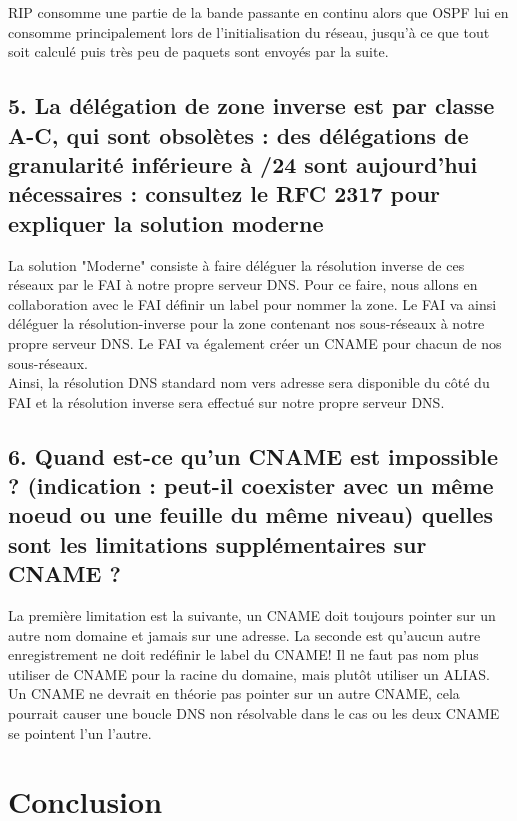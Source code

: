\documentclass{article}
\begin{document}
RIP consomme une partie de la bande passante en continu alors que OSPF lui en consomme principalement lors de l'initialisation du réseau, jusqu'à ce que tout soit calculé puis très peu de paquets sont envoyés par la suite.\\

\subsection*{5. La délégation de zone inverse est par classe A-C, qui sont obsolètes : des délégations de granularité inférieure à /24 sont aujourd’hui nécessaires : consultez le RFC 2317 pour expliquer la solution moderne}
La solution "Moderne" consiste à faire déléguer la résolution inverse de ces réseaux par le FAI à notre propre serveur DNS. Pour ce faire, nous allons en collaboration avec le FAI définir un label pour nommer la zone. Le FAI va ainsi déléguer la résolution-inverse pour la zone contenant nos sous-réseaux à notre propre serveur DNS. Le FAI va également créer un CNAME pour chacun de nos sous-réseaux.\\

Ainsi, la résolution DNS standard nom vers adresse sera disponible du côté du FAI et la résolution inverse sera effectué sur notre propre serveur DNS\cite{RFC-2317-ietf}\cite{RFC-2317-divers}.

\subsection*{6. Quand est-ce qu’un CNAME est impossible ? (indication : peut-il coexister avec un même noeud ou une feuille du même niveau) quelles sont les limitations supplémentaires sur CNAME ?}
La première limitation est la suivante, un CNAME\cite{CNAME} doit toujours pointer sur un autre nom domaine et jamais sur une adresse. La seconde est qu'aucun autre enregistrement ne doit redéfinir le label du CNAME! Il ne faut pas nom plus utiliser de CNAME pour la racine du domaine, mais plutôt utiliser un ALIAS\cite{ALIAS}.\\

Un CNAME ne devrait en théorie pas pointer sur un autre CNAME, cela pourrait causer une boucle DNS non résolvable dans le cas ou les deux CNAME se pointent l'un l'autre.\cite{cname-limitations}\\


\section{Conclusion}

\newpage
\printbibliography
\end{document}
